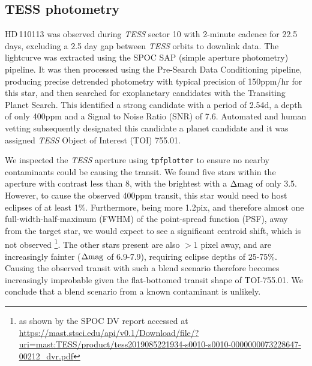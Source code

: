 \documentclass[fleqn,usenatbib]{mnras}
\newcommand{\tess}{{\it TESS}}
\newcommand{\Tstar}{HD\,110113}
\begin{document}
\subsection{TESS photometry}
\Tstar{} was observed during \tess{} sector 10 with 2-minute cadence for 22.5 days, excluding a 2.5 day gap between \tess{} orbits to downlink data.
The lightcurve was extracted using the SPOC \citep[Science Processing Operations Centre][]{jenkins2016tess} SAP (simple aperture photometry) pipeline.
It was then processed using the Pre-Search Data Conditioning \citep[PDC,][]{stumpe2012kepler} pipeline, producing precise detrended photometry with typical precision of 150ppm/hr for this star, and then searched for exoplanetary candidates with the Transiting Planet Search.
This identified a strong candidate with a period of 2.54d, a depth of only 400ppm and a Signal to Noise Ratio (SNR) of 7.6.
Automated and human vetting subsequently designated this candidate a planet candidate and it was assigned \tess{} Object of Interest (TOI) 755.01. 

We inspected the \tess{} aperture using \texttt{tpfplotter} \citep[plotted in Figure \ref{fig:tpf};][]{2020A&A...635A.128A} to ensure no nearby contaminants could be causing the transit.
We found five stars within the aperture with contrast less than 8, with the brightest with a $\Delta{\rm mag}$ of only 3.5.
However, to cause the observed 400ppm transit, this star would need to host eclipses of at least 1\%. 
Furthermore, being more 1.2pix, and therefore almost one full-width-half-maximum (FWHM) of the point-spread function (PSF), away from the target star, we would expect to see a significant centroid shift, which is not observed \footnote{as shown by the SPOC DV report accessed at \url{https://mast.stsci.edu/api/v0.1/Download/file/?uri=mast:TESS/product/tess2019085221934-s0010-s0010-0000000073228647-00212_dvr.pdf}}.
The other stars present are also $>1$ pixel away, and are increasingly fainter ($\Delta{\rm mag}$ of 6.9-7.9), requiring eclipse depths of 25-75\%.
Causing the observed transit with such a blend scenario therefore becomes increasingly improbable given the flat-bottomed transit shape of TOI-755.01.
We conclude that a blend scenario from a known contaminant is unlikely.
\end{document}
